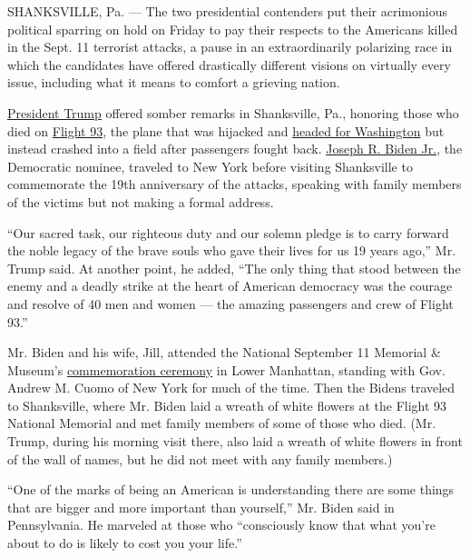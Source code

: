 SHANKSVILLE, Pa. --- The two presidential contenders put their
acrimonious political sparring on hold on Friday to pay their respects
to the Americans killed in the Sept. 11 terrorist attacks, a pause in an
extraordinarily polarizing race in which the candidates have offered
drastically different visions on virtually every issue, including what
it means to comfort a grieving nation.

\href{https://www.nytimes3xbfgragh.onion/interactive/2020/us/elections/donald-trump.html}{President
Trump} offered somber remarks in Shanksville, Pa., honoring those who
died on
\href{https://www.nytimes3xbfgragh.onion/2001/09/13/us/after-attacks-united-flight-93-doomed-flight-passengers-vowed-perish-fighting.html}{Flight
93}, the plane that was hijacked and
\href{https://www.nytimes3xbfgragh.onion/2004/07/22/politics/details-emerge-on-flight-93.html}{headed
for Washington} but instead crashed into a field after passengers fought
back.
\href{https://www.nytimes3xbfgragh.onion/interactive/2020/us/elections/joe-biden.html}{Joseph
R. Biden Jr.}, the Democratic nominee, traveled to New York before
visiting Shanksville to commemorate the 19th anniversary of the attacks,
speaking with family members of the victims but not making a formal
address.

``Our sacred task, our righteous duty and our solemn pledge is to carry
forward the noble legacy of the brave souls who gave their lives for us
19 years ago,'' Mr. Trump said. At another point, he added, ``The only
thing that stood between the enemy and a deadly strike at the heart of
American democracy was the courage and resolve of 40 men and women ---
the amazing passengers and crew of Flight 93.''

Mr. Biden and his wife, Jill, attended the National September 11
Memorial \& Museum's
\href{https://www.nytimes3xbfgragh.onion/2020/09/11/nyregion/9-11-ceremony-September-11th.html}{commemoration
ceremony} in Lower Manhattan, standing with Gov. Andrew M. Cuomo of New
York for much of the time. Then the Bidens traveled to Shanksville,
where Mr. Biden laid a wreath of white flowers at the Flight 93 National
Memorial and met family members of some of those who died. (Mr. Trump,
during his morning visit there, also laid a wreath of white flowers in
front of the wall of names, but he did not meet with any family
members.)

``One of the marks of being an American is understanding there are some
things that are bigger and more important than yourself,'' Mr. Biden
said in Pennsylvania. He marveled at those who ``consciously know that
what you're about to do is likely to cost you your life.''

